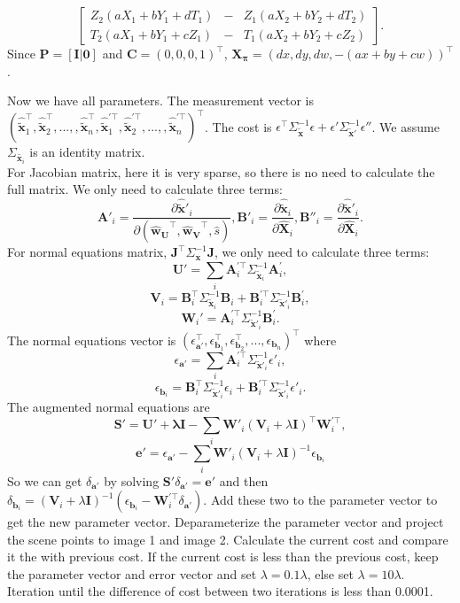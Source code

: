 \documentclass{../../assignment}
\begin{document}
\begin{problemlist}
\begin{enumerate}
\begin{enumerate}
$$\begin{bmatrix}
Z_2(aX_1+bY_1+dT_1) & - & Z_1(aX_2+bY_2+dT_2)\\
T_2(aX_1+bY_1+cZ_1) & - & T_1(aX_2+bY_2+cZ_2)
\end{bmatrix}.
$$
Since $\mathbf{P} = [\mathbf{I}|\mathbf{0}]$ and $\mathbf{C} = (0,0,0,1)^{\top}$, $\mathbf{X_{\pi}} = (dx,dy,dw,-(ax+by+cw))^{\top}$.
\end{enumerate}
Now we have all parameters. The measurement vector is 
$(\hat{\tilde{\mathbf{x}}}_1^{\top},\hat{\tilde{\mathbf{x}}}_2^{\top},...,,\hat{\tilde{\mathbf{x}}}_n^{\top},\hat{\tilde{\mathbf{x}}}_1^{'\top},\hat{\tilde{\mathbf{x}}}_2^{'\top},...,,\hat{\tilde{\mathbf{x}}}_n^{'\top})^{\top}$. The cost is $\epsilon^{\top}\Sigma_{\tilde{\mathbf{x}}}^{-1}\epsilon + \epsilon'\Sigma_{\tilde{\mathbf{x}}'}^{-1}\epsilon''$. We assume $\Sigma_{\tilde{\mathbf{x}_i}}$ is an identity matrix.\\
For Jacobian matrix, here it is very sparse, so there is no need to calculate the full matrix. We only need to calculate three terms:
$$
\mathbf{A}'_i = \frac{\partial \hat{\tilde{\mathbf{x}}}'_i}{\partial (\mathbf{\hat{w}_U}^{\top},\mathbf{\hat{w}_V}^{\top},\hat{s})},
\mathbf{B}'_i = \frac{\partial \hat{\tilde{\mathbf{x}}}_i}{\partial \hat{\mathbf{X}}_i},
\mathbf{B}''_i = \frac{\partial \hat{\tilde{\mathbf{x}}}'_i}{\partial \hat{\mathbf{X}}_i}
.
$$
For normal equations matrix, $\mathbf{J}^{\top}\Sigma_{\mathbf{x}}^{-1}\mathbf{J}$, we only need to calculate three terms:
$$
\mathbf{U}' = \sum_i \mathbf{A}_i^{'\top}\Sigma_{\tilde{\mathbf{x}}_i}^{-1}  \mathbf{A}_i^{'},
$$
$$
\mathbf{V}_i = \mathbf{B}_i^{\top}\Sigma_{\tilde{\mathbf{x}}_i}^{-1}  \mathbf{B}_i + \mathbf{B}_i^{'\top}\Sigma_{\tilde{\mathbf{x}}'_i}^{-1}  \mathbf{B}_i^{'},
$$
$$
\mathbf{W}_i' = \mathbf{A}_i^{'\top}\Sigma_{\tilde{\mathbf{x}}'_i}^{-1}  \mathbf{B}_i^{'}.
$$
The normal equations vector is $(\epsilon_{\mathbf{a}'}^{\top},\epsilon_{\mathbf{b}_1}^{\top},\epsilon_{\mathbf{b}_2}^{\top},...,\epsilon_{\mathbf{b}_n})^{\top}$
where
$$
\epsilon_{\mathbf{a}'} = \sum_i \mathbf{A}_i^{'\top}\Sigma_{\tilde{\mathbf{x}}'_i}^{-1}  \epsilon'_i,
$$
$$
\epsilon_{\mathbf{b}_i} = \mathbf{B}_i^{\top}\Sigma_{\tilde{\mathbf{x}}'_i}^{-1}  \epsilon_i + \mathbf{B}_i^{'\top}\Sigma_{\tilde{\mathbf{x}}'_i}^{-1}  \epsilon'_i.
$$
The augmented normal equations are
$$
\mathbf{S}'=\mathbf{U'+\lambda I}-\sum_i \mathbf{W}'_i(\mathbf{V}_i+\lambda \mathbf{I})^{\top}\mathbf{W}_i^{'\top},
$$
$$
\mathbf{e}'= \epsilon_{\mathbf{a}'} - \sum_i \mathbf{W}'_i(\mathbf{V}_i+\lambda \mathbf{I})^{-1} \epsilon_{\mathbf{b}_i}
$$
So we can get $\delta_{\mathbf{a}'}$ by solving $\mathbf{S}'\delta_{\mathbf{a}'} = \mathbf{e}'$ and then $\delta_{\mathbf{b}_i} = (\mathbf{V}_i+\lambda \mathbf{I})^{-1}(\epsilon_{\mathbf{b}_i} - \mathbf{W}_i^{'\top}\delta_{\mathbf{a}'})$. Add these two to the parameter vector to get the new parameter vector. Deparameterize the parameter vector and project the scene points to image 1 and image 2. Calculate the current cost and compare it the with previous cost. If the current cost is less than the previous cost, keep the parameter vector and error vector and set $\lambda = 0.1\lambda$, else set $\lambda = 10\lambda$. Iteration until the difference of cost between two iterations is less than 0.0001.

\end{enumerate}
\end{problemlist}
\end{document}
